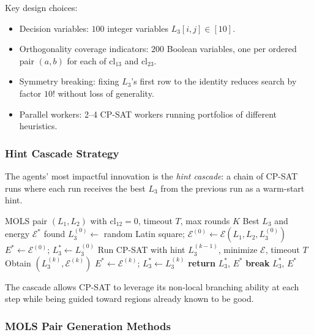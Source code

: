 \documentclass[11pt,a4paper]{article}
\theoremstyle{remark}
\newcommand{\cl}{\mathrm{cl}}
\newcommand{\E}{\mathcal{E}}
\begin{document}
Key design choices:
\begin{itemize}[noitemsep]
  \item Decision variables: $100$ integer variables $L_3[i,j] \in [10]$.
  \item Orthogonality coverage indicators: $200$ Boolean variables, one per ordered pair
    $(a,b)$ for each of $\cl_{13}$ and $\cl_{23}$.
  \item Symmetry breaking: fixing $L_3$'s first row to the identity reduces search by
    factor $10!$ without loss of generality.
  \item Parallel workers: 2--4 CP-SAT workers running portfolios of different heuristics.
\end{itemize}

\subsubsection{Hint Cascade Strategy}

The agents' most impactful innovation is the \emph{hint cascade}: a chain of CP-SAT runs
where each run receives the best $L_3$ from the previous run as a warm-start hint.

\begin{algorithm}[h]
\caption{Hint Cascade for Pair $(L_1, L_2)$}\label{alg:cascade}
\begin{algorithmic}[1]
\Require MOLS pair $(L_1, L_2)$ with $\cl_{12}=0$, timeout $T$, max rounds $K$
\Ensure Best $L_3$ and energy $\E^*$ found
\State $L_3^{(0)} \leftarrow$ random Latin square; $\E^{(0)} \leftarrow \E(L_1,L_2,L_3^{(0)})$
\State $E^* \leftarrow \E^{(0)}$; $L_3^* \leftarrow L_3^{(0)}$
  \State Run CP-SAT with hint $L_3^{(k-1)}$, minimize $\E$, timeout $T$
  \State Obtain $(L_3^{(k)}, \E^{(k)})$
  \If{$\E^{(k)} < E^*$}
    \State $E^* \leftarrow \E^{(k)}$; $L_3^* \leftarrow L_3^{(k)}$
  \EndIf
  \If{$\E^{(k)} = 0$} \textbf{return} $L_3^*$, $E^*$ 
  \EndIf
  \If{$\E^{(k)} \geq \E^{(k-1)}$} \textbf{break} 
  \EndIf
\EndFor
\State \Return $L_3^*$, $E^*$
\end{algorithmic}
\end{algorithm}

The cascade allows CP-SAT to leverage its non-local branching ability at each step while
being guided toward regions already known to be good.

\subsubsection{MOLS Pair Generation Methods}
\end{document}

